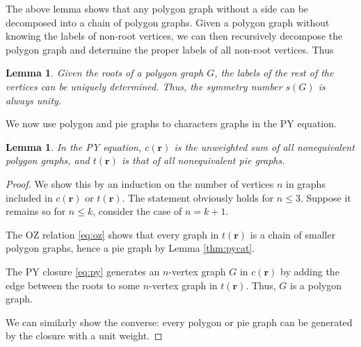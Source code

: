 \documentclass[preprint]{revtex4-1}
\newtheorem{lemm}[thrm]{Lemma}
\newcommand{\vct}[1]{\mathbf{#1}}
\providecommand{\vr}{} %
\renewcommand{\vr}{\vct{r}}
\begin{document}
The above lemma shows that
any polygon graph without a side
can be decomposed into a chain of polygon graphs.
%
Given a polygon graph without knowing the labels of non-root vertices,
we can then recursively decompose the polygon graph
and determine the proper labels of all non-root vertices.
%
Thus

\begin{lemm}
Given the roots of a polygon graph $G$,
  the labels of the rest of the vertices
  can be uniquely determined.
Thus,
  the symmetry number $s(G)$ is always unity.
  \label{thm:polygonsymnum}
\end{lemm}



We now use polygon and pie graphs to characters
  graphs in the PY equation.

\begin{lemm}
In the PY equation,
  $c(\vr)$ is the unweighted sum of
  all nonequivalent polygon graphs,
  and $t(\vr)$ is that of all nonequivalent
  pie graphs\cite{rice1965}.
\label{thm:pycrsum}
\end{lemm}

\begin{proof}
We show this by an induction on the number of vertices $n$ in
  graphs included in $c(\vr)$ or $t(\vr)$.
%
The statement obviously holds for $n \le 3$.
%
Suppose it remains so for $n \le k$,
consider the case of $n = k + 1$.

The OZ relation \eqref{eq:oz}
  shows that every graph in $t(\vr)$
  is a chain of smaller polygon graphs,
  hence a pie graph by Lemma \ref{thm:pycat}.

The PY closure \eqref{eq:py} generates
  an $n$-vertex graph $G$ in $c(\vr)$
  by adding the edge between the roots
  to some $n$-vertex graph in $t(\vr)$.
%
Thus, $G$ is a polygon graph.

We can similarly show the converse:
  every polygon or pie graph
  can be generated by the closure
  with a unit weight.
\end{proof}


\end{document}
